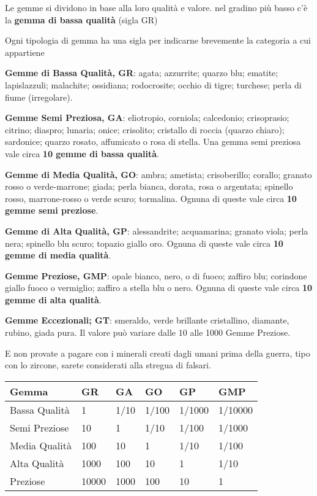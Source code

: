 \documentclass[12pt,a4paper,twoside,openany]{book}
\begin{document}
\begin{multicols}{2}
Le gemme si dividono in base alla loro qualità e valore. nel gradino più basso c'è la \textbf{gemma di bassa qualità} (sigla GR)

Ogni tipologia di gemma ha una sigla per indicarne brevemente la categoria a cui appartiene

\textbf{Gemme di Bassa Qualità, GR}: agata; azzurrite; quarzo blu; ematite; lapislazzuli; malachite; ossidiana; rodocrosite; occhio di tigre; turchese; perla di fiume (irregolare).

\textbf{Gemme Semi Preziosa, GA}: eliotropio, corniola; calcedonio; crisoprasio; citrino; diaspro; lunaria; onice; crisolito; cristallo di roccia (quarzo chiaro); sardonice; quarzo rosato, affumicato o rosa di stella. Una gemma semi preziosa vale circa \textbf{10 gemme di bassa qualità}.

\textbf{Gemme di Media Qualità, GO}: ambra; ametista; crisoberillo; corallo; granato rosso o verde-marrone; giada; perla bianca, dorata, rosa o argentata; spinello rosso, marrone-rosso o verde scuro; tormalina. Ognuna di queste vale circa \textbf{10 gemme semi preziose}.

\textbf{Gemme di Alta Qualità, GP}: alessandrite; acquamarina; granato viola; perla nera; spinello blu scuro; topazio giallo oro.  Ognuna di queste vale circa \textbf{10 gemme di media qualità}.

\textbf{Gemme Preziose, GMP}: opale bianco, nero, o di fuoco; zaffiro blu; corindone giallo fuoco o vermiglio; zaffiro a stella blu o nero. Ognuna di queste vale circa \textbf{10 gemme di alta qualità}.

\textbf{Gemme Eccezionali; GT}: smeraldo, verde brillante cristallino, diamante, rubino, giada pura. Il valore può variare dalle 10 alle 1000 Gemme Preziose.

E non provate a pagare con i minerali creati dagli umani prima della guerra, tipo con lo zircone, sarete considerati alla stregua di falsari.

\end{multicols}
\begin{center}
	\begin{tabular}{llllll}
	
\textbf{Gemma} & \textbf{GR}& \textbf{GA} &\textbf{GO} &\textbf{GP} &\textbf{GMP} \\
	\toprule
Bassa Qualità	& 1		 &1/10	&1/100	&1/1000	&1/10000 \\
Semi Preziose	& 10	 &1		&1/10	&1/100	&1/1000 \\
Media Qualità	& 100	 &10	&1		&1/10	&1/100	 \\
Alta Qualità 	& 1000   &100  	&10		&1	 	&1/10	\\
Preziose	 	& 10000  &1000 	&100  	&10		&1	\\

\end{tabular}

\end{center}
\bigskip
\end{document}
